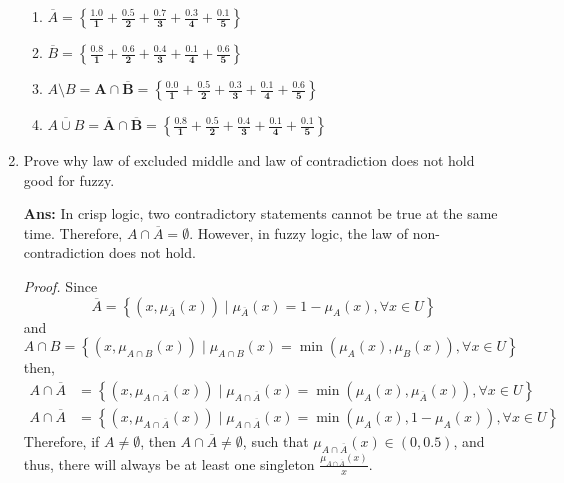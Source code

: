 \documentclass{article}
\begin{document}
\begin{enumerate}
\begin{enumerate}
          \item $\overline{A} \boldsymbol{=
                    \left\{
                    \frac{1.0}{1} +
                    \frac{0.5}{2} +
                    \frac{0.7}{3} +
                    \frac{0.3}{4} +
                    \frac{0.1}{5}
                    \right\}}$

          \item $\overline{B} \boldsymbol{=
                    \left\{
                    \frac{0.8}{1} +
                    \frac{0.6}{2} +
                    \frac{0.4}{3} +
                    \frac{0.1}{4} +
                    \frac{0.6}{5}
                    \right\}}$

          \item $A \setminus B \boldsymbol{= A \cap \overline{B} =
                    \left\{
                    \frac{0.0}{1} +
                    \frac{0.5}{2} +
                    \frac{0.3}{3} +
                    \frac{0.1}{4} +
                    \frac{0.6}{5}
                    \right\}}$

          \item $\overline{A \cup B} \boldsymbol{
                    = \overline{A} \cap \overline{B} =
                    \left\{
                    \frac{0.8}{1} +
                    \frac{0.5}{2} +
                    \frac{0.4}{3} +
                    \frac{0.1}{4} +
                    \frac{0.1}{5}
                    \right\}}$

        \end{enumerate}

  \item Prove why law of excluded middle and law of contradiction does not hold good for fuzzy.

        \textbf{Ans:}
        In crisp logic, two contradictory statements cannot be true at the same time. Therefore, \(A \cap \overline{A} = \emptyset\). However, in fuzzy logic, the law of non-contradiction does not hold.

        \textit{Proof.} Since
        \[
          \overline{A} = \left\{(x, {\mu}_{\overline{A}}(x)) \mid {\mu}_{\overline{A}}(x) = 1 - {\mu}_{A}(x), \forall x \in U\right\}
        \]
        and
        \[
          A \cap B = \left\{(x, {\mu}_{{A \cap B}}(x)) \mid {\mu}_{{A \cap B}}(x) = \min\left({\mu}_{A}(x), {\mu}_{B}(x)\right), \forall x \in U\right\}
        \]
        then,
        \begin{align*}
          A \cap \overline{A} & = \left\{(x, {\mu}_{{A \cap \overline{A}}}(x)) \mid {\mu}_{{A \cap \overline{A}}}(x) = \min\left({\mu}_{A}(x), {\mu}_{\overline{A}}(x)\right), \forall x \in U\right\} \\
          A \cap \overline{A} & = \left\{(x, {\mu}_{{A \cap \overline{A}}}(x)) \mid {\mu}_{{A \cap \overline{A}}}(x) = \min\left({\mu}_{A}(x), 1 - {\mu}_{A}(x)\right), \forall x \in U\right\}
        \end{align*}
        Therefore, if \(A \neq \emptyset\), then \(A \cap \overline{A} \neq \emptyset\), such that \({\mu}_{{A \cap \overline{A}}}(x) \in (0, 0.5)\), and thus, there will always be at least one singleton \(\frac{{\mu}_{{A \cap \overline{A}}}(x)}{x}\).


\end{enumerate}
\end{document}
